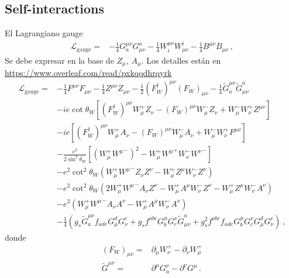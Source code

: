 \subsection{Self-interactions}

\begin{frame}
El Lagrangiano gauge
\begin{align}
  \mathcal{L}_{\text{gauge}}=& -\tfrac{1}{4}G^{\mu\nu}_a G_{\mu\nu}^a-\tfrac{1}{4}W^{\mu\nu}_i W_{\mu\nu}^i-\tfrac{1}{4}B^{\mu\nu} B_{\mu\nu}\,,
\end{align}
Se debe expresar en la base de $Z_\mu$, $A_\mu$. Los detalles están en \url{https://www.overleaf.com/read/pxkqqdhrqyrk}
\begin{align}
\label{eq:lgaguefin}
\mathcal{L}_{\text{gauge}}=&  -\tfrac{1}{4}F^{\mu\nu} F_{\mu\nu}-\tfrac{1}{4}Z^{\mu\nu} Z_{\mu\nu}-\tfrac{1}{2}(F_W^\dagger)^{\mu\nu} (F_W)_{\mu\nu}
- \tfrac{1}{4}\widetilde{G}^{\mu\nu}_a \widetilde{G}_{\mu\nu}^a\nonumber\\
&-ie\cot\theta_W\left[(F_W^\dagger)^{\mu\nu}W_\mu^+ Z_\nu-(F_W)^{\mu\nu}W_\mu^- Z_\nu+W_\mu^-W_\nu^+Z^{\mu\nu}\right]\nonumber\\
&-ie\left[(F_W^\dagger)^{\mu\nu}W_\mu^+ A_\nu-(F_W)^{\mu\nu}W_\mu^- A_\nu+W_\mu^-W_\nu^+F^{\mu\nu}\right]\nonumber\\
&-\frac{e^2}{2\sin^2\theta_W}\left[\left(W_\mu^+{W^\mu}^-\right)^2-W_\mu^+{W^\mu}^+W_\nu^-{W^\nu}^-\right] \nonumber\\
&-e^2\cot^2\theta_W\left(W_\mu^+{W^\mu}^-Z_\nu Z^\nu-W_\mu^+Z^\mu W_\nu^-Z^\nu\right)\nonumber\\
&-e^2\cot^2\theta_W\left(2W_\mu^+{W^\mu}^-A_\nu Z^\nu-W_\mu^+A^\mu W_\nu^-Z^\nu-W_\mu^+Z^\mu W_\nu^-A^\nu\right)\nonumber\\
&-e^2\left(W_\mu^+{W^\mu}^-A_\nu A^\nu-W_\mu^+A^\mu W_\nu^-A^\nu\right)\nonumber\\
&- \frac{1}{4}\left(g_s\widetilde{G}^{\mu\nu}_af_{a d e}G^d_\mu G^e_\nu
    +g_sf^{a b c}G_b^\mu G_c^\nu\widetilde{G}_{\mu\nu}^a
    +g_s^2f^{a b c}f_{a d e}G_b^\mu G_c^\nu G^d_\mu G^e_\nu\right)\,,
\end{align}
donde
\begin{align}
  (F_W)_{\mu\nu}=&\partial_\mu W^+_\nu-\partial_\nu W^+_\mu\nonumber\\
  \widetilde{G}^{\mu\nu}=&\partial^\mu G^\nu_a-\partial^\nu G^\mu\,.
\end{align}

\end{frame}

